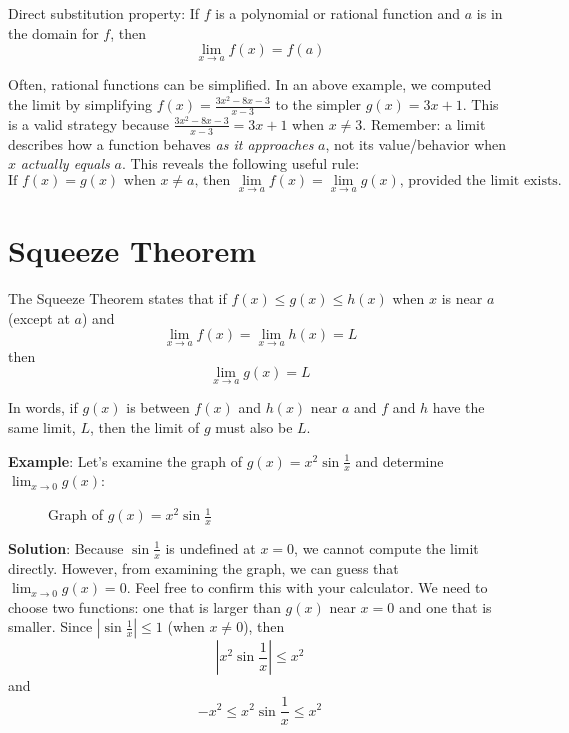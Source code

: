 Direct substitution property: If $f$ is a polynomial or rational function and $a$ 
is in the domain for $f$, then $$\lim_{x \to a}f(x) = f(a)$$

Often, rational functions can be simplified. In an above example, we computed the 
limit by simplifying $f(x) = \frac{3x^2-8x-3}{x-3}$ to the simpler $g(x) = 3x+1$. 
This is a valid strategy because $\frac{3x^2-8x-3}{x-3} = 3x+1$ when $x \neq 3$. 
Remember: a limit describes how a function behaves \textit{as it approaches} $a$, 
not its value/behavior when $x$ \textit{actually equals} $a$. This reveals the 
following useful rule: 
$$\text{If } f(x)=g(x) \text{ when } x \neq a \text{, then } 
\lim_{x \to a}f(x) = \lim_{x \to a}g(x) \text{, provided the limit exists.}$$

\section{Squeeze Theorem}

The Squeeze Theorem states that if $f(x) \leq g(x) \leq h(x)$ when $x$ is near $a$ 
(except at $a$) and $$\lim_{x \to a}f(x)=\lim_{x \to a}h(x) = L$$ then $$\lim_{x 
\to a}g(x) = L$$

In words, if $g(x)$ is between $f(x)$ and $h(x)$ near $a$ and $f$ and $h$ have the 
same limit, $L$, then the limit of $g$ must also be $L$. 

\textbf{Example}: Let's examine the graph of $g(x) = x^2\sin{\frac{1}{x}}$ and determine $\lim_{x \to 
0}g(x)$:

\begin{figure}[htbp]
\centering
{}
\caption{Graph of $g(x) = x^2\sin{\frac{1}{x}}$}
\end{figure}

\textbf{Solution}: Because $\sin{\frac{1}{x}}$ is undefined at $x=0$, we cannot 
compute the limit directly. However, from examining the graph, we can guess 
that $\lim_{x \to 0} g(x) = 0$. Feel free to confirm this with your calculator. 
We need to choose two functions: one that is larger than $g(x)$ near $x = 0$ 
and one that is smaller. Since $|\sin{\frac{1}{x}}|\leq 1$ (when $x \neq 0$), 
then $$|x^2 \sin{\frac{1}{x}}| \leq x^2$$ and $$-x^2 \leq x^2 \sin{\frac{1}{x}} 
\leq x^2$$

